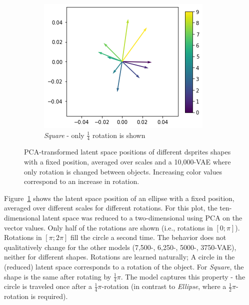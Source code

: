 \begin{figure}
    \hfill
    \begin{subfigure}{.3\textwidth}
        \includegraphics[width=\textwidth]{images/latent_space_traversals/vae_dsprites_orientation_latent_space_square.png}
        \caption{\textit{Square} - only $\frac{1}{4}$ rotation is shown}
    \end{subfigure}
    \caption[10,000-\ac{VAE} - Rotation latent space]{\ac{PCA}-transformed latent space positions of different dsprites shapes with a fixed position, averaged over scales and a 10,000-\ac{VAE} where only rotation is changed between objects. Increasing color values correspond to an increase in rotation. }
    \label{fig:vae_dsprites_rotation_latent_space_vae_10000}
\end{figure}

Figure~\ref{fig:vae_dsprites_rotation_latent_space_vae_10000} shows the latent space position of an ellipse with a fixed position, averaged over different scales for different rotations.
For this plot, the ten-dimensional latent space was reduced to a two-dimensional using \ac{PCA} on the vector values.
Only half of the rotations are shown (i.e., rotations in $[0;\pi]$).
Rotations in $[\pi; 2\pi]$ fill the circle a second time.
The behavior does not qualitatively change for the other models (7,500-, 6,250-, 5000-, 3750-\ac{VAE}), neither for different shapes.
Rotations are learned naturally;
A circle in the (reduced) latent space corresponds to a rotation of the object.
For \textit{Square}, the shape is the same after rotating by $\frac{1}{4}\pi$.
The model captures this property - the circle is traveled once after a $\frac{1}{4}\pi$-rotation (in contrast to \textit{Ellipse}, where a $\frac{1}{2}\pi$-rotation is required).


